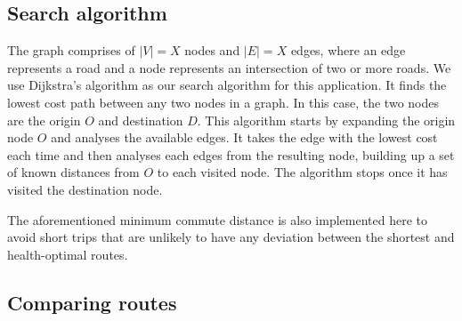 \documentclass[11pt,twosided,a4paper]{report}
\begin{document}
%
%

\subsection{Search algorithm}

The graph comprises of $|V| = X$ nodes and $|E| = X$ edges, where an edge represents a road and a node represents an intersection of two or more roads. We use Dijkstra's algorithm \citep{dijkstra1959} as our search algorithm for this application. It finds the lowest cost path between any two nodes in a graph. In this case, the two nodes are the origin $O$ and destination $D$. This algorithm starts by expanding the origin node $O$ and analyses the available edges. It takes the edge with the lowest cost each time and then analyses each edges from the resulting node, building up a set of known distances from $O$ to each visited node. The algorithm stops once it has visited the destination node.

The aforementioned minimum commute distance is also implemented here to avoid short trips that are unlikely to have any deviation between the shortest and health-optimal routes.


\subsection{Comparing routes}
\end{document}
